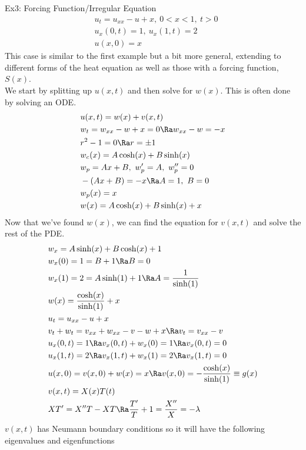 Ex3: Forcing Function/Irregular Equation
\begin{align*}
    &u_t=u_{xx}-u+x,\ 0<x<1,\ t>0\\
    &u_x(0,t)=1,\ u_x(1,t)=2\\
    &u(x,0)=x
\end{align*}
This case is similar to the first example but a bit more general, extending to different forms of the heat equation as well as those with a forcing function, $S(x)$.\\
We start by splitting up $u(x,t)$ and then solve for $w(x)$. This is often done by solving an ODE.
\begin{align*}
    &u(x,t)=w(x)+v(x,t)\\
    &w_t=w_{xx}-w+x=0\Ra w_{xx}-w=-x\\
    &r^2-1=0\Ra r=\pm1\\
    &w_c(x)=A\cosh(x)+B\sinh(x)\\
    &w_p=Ax+B,\ w_p'=A,\ w_p''=0\\
    &-(Ax+B)=-x\Ra A=1,\ B=0\\
    &w_p(x)=x\\
    &w(x)=A\cosh(x)+B\sinh(x)+x
\end{align*}
Now that we've found $w(x)$, we can find the equation for $v(x,t)$ and solve the rest of the PDE.
\begin{align*}
    &w_x=A\sinh(x)+B\cosh(x)+1\\
    &w_x(0)=1=B+1\Ra B=0\\
    &w_x(1)=2=A\sinh(1)+1\Ra A=\frac{1}{\sinh(1)}\\
    &w(x)=\frac{\cosh(x)}{\sinh(1)}+x\\
    &u_t=u_{xx}-u+x\\
    &v_t+w_t=v_{xx}+w_{xx}-v-w+x\Ra v_t=v_{xx}-v\\
    &u_x(0,t)=1\Ra v_x(0,t)+w_x(0)=1\Ra v_x(0,t)=0\\
    &u_x(1,t)=2\Ra v_x(1,t)+w_x(1)=2\Ra v_x(1,t)=0\\
    &u(x,0)=v(x,0)+w(x)=x\Ra v(x,0)=-\frac{\cosh(x)}{\sinh(1)}\equiv g(x)\\
    &v(x,t)=X(x)T(t)\\
    &XT'=X''T-XT\Ra \frac{T'}{T}+1=\frac{X''}{X}=-\lambda
\end{align*}
$v(x,t)$ has Neumann boundary conditions so it will have the following eigenvalues and eigenfunctions
